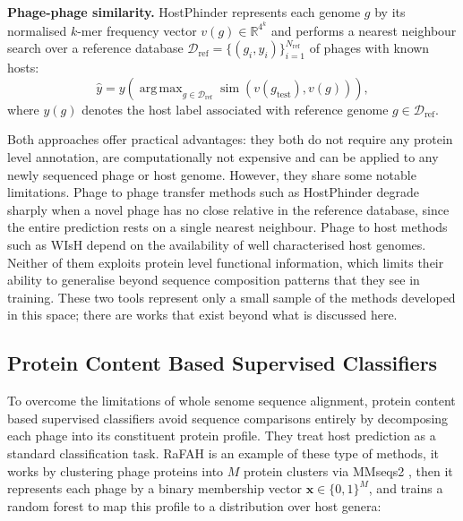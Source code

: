 \noindent\textbf{Phage-phage similarity.} HostPhinder \cite{villarroel2016hostphinder} represents each 
genome $g$ by its normalised $k$-mer frequency vector $v(g) \in \mathbb{R}^{4^k}$ and performs a 
nearest neighbour search over a reference database $\mathcal{D}_{\text{ref}} = \{(g_i, y_i)\}_{i=1}^{N_{\text{ref}}}$ 
of phages with known hosts:
\begin{equation*}
\hat{y} = y\left( \operatorname{arg\,max}_{g \in \mathcal{D}_{\text{ref}}} \operatorname{sim}(v(g_{\text{test}}), 
v(g)) \right),
\end{equation*}
where $y(g)$ denotes the host label associated with reference genome $g \in \mathcal{D}_{\text{ref}}$.

Both approaches offer practical advantages: they both do not require any protein level annotation, are computationally 
not expensive and can be applied to any newly sequenced phage or host genome. However, they share some notable limitations. 
Phage to phage transfer methods such as HostPhinder degrade sharply when a novel phage has no close relative in the 
reference database, since the entire prediction rests on a single nearest neighbour. Phage to host methods such as 
WIsH depend on the availability of well characterised host genomes. Neither of them exploits protein level functional 
information, which limits their ability to generalise beyond sequence composition patterns that they see in training. 
These two tools represent only a small sample of the methods developed in this space; there are works that exist beyond 
what is discussed here.

\newpage
\subsection{Protein Content Based Supervised Classifiers}
\label{sec2.2.2: protein content classifiers}
To overcome the limitations of whole senome sequence alignment, protein content based supervised classifiers avoid sequence 
comparisons entirely by decomposing each phage into its constituent protein profile. They treat host prediction as a standard 
classification task. RaFAH \cite{coutinho2021rafah} is an example of these type of methods, it works 
by clustering phage proteins into $M$ protein clusters via MMseqs2 \cite{steinegger2017mmseqs2}, then it represents 
each phage by a binary membership vector $\mathbf{x} \in \{0,1\}^M$, and trains a random forest to map this profile to 
a distribution over host genera:


